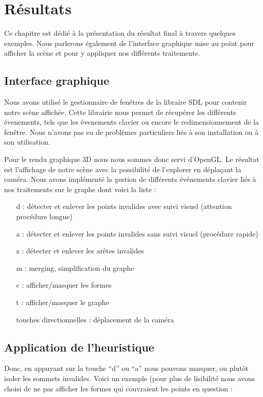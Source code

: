 \documentclass[a4paper,12pt]{report}
\begin{document}
\chapter{Résultats}

Ce chapitre est dédié à la présentation du résultat final à travers quelques exemples. Nous parlerons également de l'interface graphique mise au point pour afficher la scène et pour y appliquer nos différents traitements.

\section{Interface graphique}

Nous avons utilisé le gestionnaire de fenêtres de la libraire SDL pour contenir notre scène affichée. Cette librairie nous permet de récupérer les différents évenements, tels que les évenements clavier ou encore le redimensionnement de la fenêtre. Nous n'avons pas eu de problèmes particuliers liés à son installation ou à son utilisation.

Pour le rendu graphique 3D nous nous sommes donc servi d'OpenGL. Le résultat est l'affichage de notre scène avec la possibilité de l'explorer en déplaçant la caméra. Nous avons implémenté la gestion de différents événements clavier liés à nos traitements sur le graphe dont voici la liste :

\begin{itemize}
 \item[d] : détecter et enlever les points invalides avec suivi visuel (attention procédure longue)
 \item[a] : détecter et enlever les points invalides sans suivi visuel (procédure rapide)
 \item[z] : détecter et enlever les arêtes invalides
 \item[m] : merging, simplification du graphe
 \item[c] : afficher/masquer les formes
 \item[t] : afficher/masquer le graphe
 \item[touches directionnelles] : déplacement de la caméra
\end{itemize}


\section{Application de l'heuristique}

Donc, en appuyant sur la touche ``d'' ou ``a'' nous pouvons masquer, ou plutôt isoler les sommets invalides. Voici un exemple (pour plus de lisibilité nous avons choisi de ne pas afficher les formes qui couvraient les points en question : 
\end{document}
